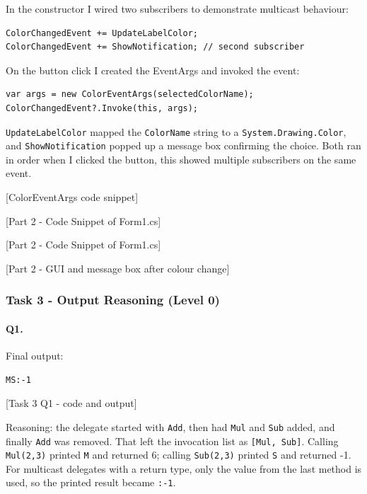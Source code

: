 In the constructor I wired two subscribers to demonstrate multicast behaviour:
\begin{lstlisting}
ColorChangedEvent += UpdateLabelColor;
ColorChangedEvent += ShowNotification; // second subscriber
\end{lstlisting}

On the button click I created the EventArgs and invoked the event:
\begin{lstlisting}
var args = new ColorEventArgs(selectedColorName);
ColorChangedEvent?.Invoke(this, args);
\end{lstlisting}

	\texttt{UpdateLabelColor} mapped the \texttt{ColorName} string to a \texttt{System.Drawing.Color}, and \texttt{ShowNotification} popped up a message box confirming the choice. Both ran in order when I clicked the button, this showed multiple subscribers on the same event.

[ColorEventArgs code snippet]

[Part 2 - Code Snippet of Form1.cs]

[Part 2 - Code Snippet of Form1.cs]

[Part 2 - GUI and message box after colour change]

\subsubsection{Task 3 - Output Reasoning (Level 0)}

\paragraph{Q1.} Final output: 
\begin{lstlisting}
MS:-1
\end{lstlisting}

[Task 3 Q1 - code and output]

Reasoning: the delegate started with \texttt{Add}, then had \texttt{Mul} and \texttt{Sub} added, and finally \texttt{Add} was removed. That left the invocation list as \texttt{[Mul, Sub]}. Calling \texttt{Mul(2,3)} printed \texttt{M} and returned 6; calling \texttt{Sub(2,3)} printed \texttt{S} and returned -1. For multicast delegates with a return type, only the value from the last method is used, so the printed result became \texttt{:-1}.

\newpage

